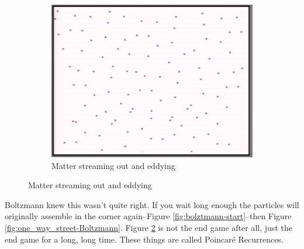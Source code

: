 \documentclass[]{article}
\begin{document}
\begin{figure}[H]
\begin{center}
		\begin{subfigure}[b]{0.3\textwidth}
			\caption{Matter streaming out and eddying}\label{fig:end-game-thermal-equilibrium}
			\includegraphics[width=\textwidth]{end-game-thermal-equilibrium}
		\end{subfigure}
	\end{center}
\end{figure}

Boltzmann knew this wasn't quite right. If you wait long enough the particles will originally assemble in the corner again--Figure \ref{fig:bolztmann-start}--then Figure \ref{fig:one_way_street-Boltzmann}. Figure \ref{fig:end-game-thermal-equilibrium} is not the end game after all, just the end game for a long, long time. These things are called Poincar\'e Recurrences. 
\end{document}
